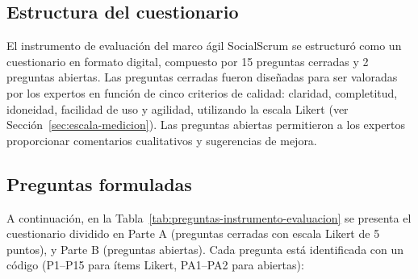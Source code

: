 \subsection{Estructura del cuestionario}
El instrumento de evaluación del marco ágil SocialScrum se estructuró como un cuestionario en formato digital, compuesto por 15 preguntas cerradas y 2 preguntas abiertas. Las preguntas cerradas fueron diseñadas para ser valoradas por los expertos en función de cinco criterios de calidad: claridad, completitud, idoneidad, facilidad de uso y agilidad, utilizando la escala Likert (ver Sección~\ref{sec:escala-medicion}). Las preguntas abiertas permitieron a los expertos proporcionar comentarios cualitativos y sugerencias de mejora.

\subsection{Preguntas formuladas}
A continuación, en la Tabla~\ref{tab:preguntas-instrumento-evaluacion} se presenta el cuestionario dividido en Parte A (preguntas cerradas con escala Likert de 5 puntos), y Parte B (preguntas abiertas). Cada pregunta está identificada con un código (P1–P15 para ítems Likert, PA1–PA2 para abiertas):

\begingroup
\scriptsize
\renewcommand{\arraystretch}{1.4}
\setlength{\tabcolsep}{4pt}
\setlength{\LTleft}{0pt}
\setlength{\LTright}{0pt}

